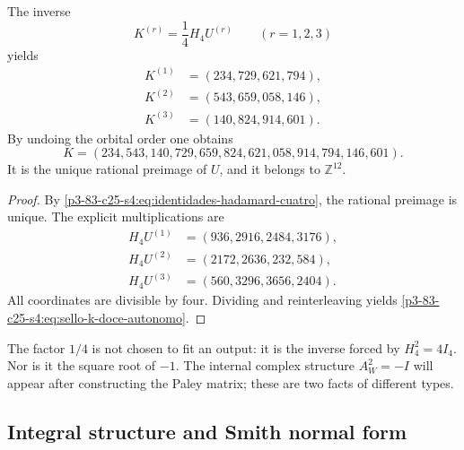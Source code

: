 \begin{theorem}
\label{p3-83-c25-s4:thm:reconstruccion-entera-k-hadamard}
The inverse
\begin{equation}
 K^{(r)}=\frac14H_4U^{(r)}
 \qquad(r=1,2,3)
 \label{p3-83-c25-s4:eq:inversion-bloques-hadamard}
\end{equation}
yields
\begin{align*}
 K^{(1)}&=(234,729,621,794),\\
 K^{(2)}&=(543,659,058,146),\\
 K^{(3)}&=(140,824,914,601).
\end{align*}
By undoing the orbital order one obtains
\begin{equation}
 \boxed{
 K=(234,543,140,729,659,824,621,058,914,794,146,601).}
 \label{p3-83-c25-s4:eq:sello-k-doce-autonomo}
\end{equation}
It is the unique rational preimage of \(U\), and it belongs to
\(\mathbb Z^{12}\).
\end{theorem}

\begin{proof}
By \eqref{p3-83-c25-s4:eq:identidades-hadamard-cuatro}, the rational preimage is unique. The explicit multiplications are
\begin{align*}
 H_4U^{(1)}&=(936,2916,2484,3176),\\
 H_4U^{(2)}&=(2172,2636,232,584),\\
 H_4U^{(3)}&=(560,3296,3656,2404).
\end{align*}
All coordinates are divisible by four. Dividing and reinterleaving
yields \eqref{p3-83-c25-s4:eq:sello-k-doce-autonomo}.
\end{proof}

The factor \(1/4\) is not chosen to fit an output: it is the inverse
forced by \(H_4^2=4I_4\). Nor is it the square root of \(-1\). The
internal complex structure \(A_W^2=-I\) will appear after constructing the
Paley matrix; these are two facts of different types.

\subsection{Integral structure and Smith normal form}

